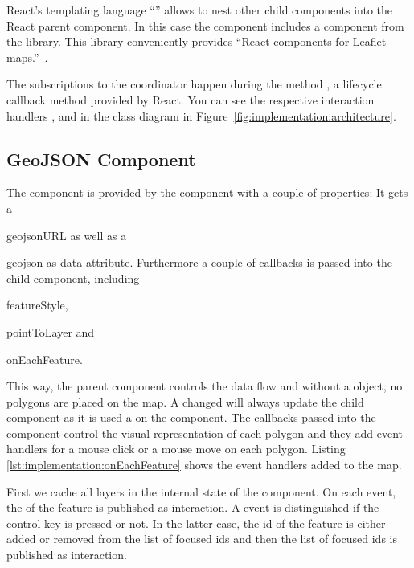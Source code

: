 React's templating language ``'' allows to nest other child components into the React parent component.
In this case the  component includes a   component from the  library.
This library conveniently provides ``React components for Leaflet maps.''~\parencite{ReactLeaflet2017}.

The subscriptions to the coordinator happen during the method , a lifecycle callback method provided by React.
You can see the respective interaction handlers ,  and  in the class diagram in Figure~\ref{fig:implementation:architecture}.


\subsection{GeoJSON Component}

The  component is provided by the  component with a couple of properties:
It gets a
\begin{enumerate*}[label=(\arabic*)]
  \item
    geojsonURL as well as a
  \item
    geojson as data attribute. Furthermore a couple of callbacks is passed into the child component, including
  \item
    featureStyle,
  \item
    pointToLayer and
  \item
    onEachFeature.
\end{enumerate*}

This way, the parent  component controls the data flow and without a  object, no polygons are placed on the map.
A changed  will always update the child component as it is used a  on the  component.
The callbacks passed into the  component control the visual representation of each polygon and they add event handlers for a mouse click or a mouse move on each polygon.
Listing \ref{lst:implementation:onEachFeature} shows the event handlers added to the map.



First we cache all layers in the internal state of the  component.
On each  event, the  of the feature is published as  interaction.
A  event is distinguished if the control key is pressed or not.
In the latter case, the id of the feature is either added or removed from the list of focused ids and then the list of focused ids is published as  interaction.

